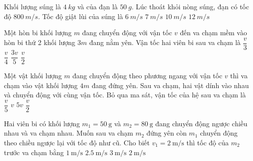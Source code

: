 \begin{ex}
	Khối lượng súng là $\SI{4}{kg}$ và của đạn là $\SI{50}{g}$. Lúc thoát khỏi nòng súng, đạn có tốc độ $\SI{800}{m/s}$. Tốc độ giật lùi của súng là
	\choice
	{$\SI{6}{m/s}$}
	{$\SI{7}{m/s}$}
	{\True $\SI{10}{m/s}$}
	{$\SI{12}{m/s}$}
\end{ex}
\begin{ex}
	Một hòn bi khối lượng $m$ đang chuyển động với vận tốc $v$ đến va chạm mềm vào hòn bi thứ 2 khối lượng $3m$ đang nằm yên. Vận tốc hai viên bi sau va chạm là
	\choice
	{$\dfrac{v}{3}$}
	{\True $\dfrac{v}{4}$}
	{$\dfrac{3v}{5}$}
	{$\dfrac{v}{2}$}
\end{ex}
\begin{ex}
	Một vật khối lượng $m$ đang chuyển động theo phương ngang với vận tốc $v$ thì va chạm vào vật khối lượng $4m$ đang đứng yên. Sau va chạm, hai vật dính vào nhau và chuyển động với cùng vận tốc. Bỏ qua ma sát, vận tốc của hệ sau va chạm là 
	\choice
	{$\dfrac{v}{5}$}
	{$v$}
	{$5v$}
	{$\dfrac{v}{2}$}
\end{ex}
\begin{ex}
Hai viên bi có khối lượng $m_1 =\SI{50}{\gram}$ và $m_2 =\SI{80}{\gram}$ đang chuyển động ngược chiều nhau và va chạm nhau. Muốn sau va chạm $m_2$ đứng yên còn $m_1$ chuyển động theo chiều ngược lại với tốc độ như cũ. Cho biết $v_1 =\SI{2}{\meter/\second}$ thì tốc độ của $m_2$ trước va chạm bằng	
	\choice
	{$\SI{1}{\meter/\second}$}
	{\True $\SI{2.5}{\meter/\second}$}
	{$\SI{3}{\meter/\second}$}
	{$\SI{2}{\meter/\second}$}
\end{ex}
